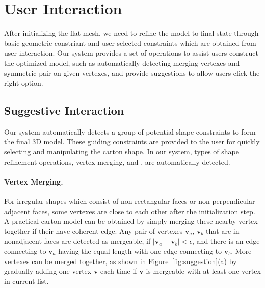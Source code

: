 \section{User Interaction}\label{sec:interaction}
After initializing the flat mesh, we need to refine the model to final state through basic geometric constriant and user-selected constraints which are obtained from user interaction. Our system provides a set of operations to assist users construct the optimized model, such as automatically detecting merging vertexes and symmetric pair on given vertexes, and provide suggestions to allow users click the right option.



\subsection{Suggestive Interaction}

Our system automatically detects a group of potential shape constraints to form the final 3D model.
%
These guiding constraints are provided to the user for quickly selecting and manipulating the carton shape.
In our system,  types of shape refinement operations, vertex merging, and , are automatically detected.

%

\paragraph{Vertex Merging.} 
For irregular shapes which consist of non-rectangular faces or non-perpendicular adjacent faces, some vertexes are close to each other after the initialization step.
A practical carton model can be obtained by simply merging these nearby vertex together if their have coherent edge.
%
Any pair of vertexes $\mathbf{v}_a$, $\mathbf{v}_b$ that are in nonadjacent faces are detected as mergeable, if $|\mathbf{v}_a-\mathbf{v}_b|<\epsilon$, and there is an edge connecting to $\mathbf{v}_a$ having the equal length with one edge connecting to $\mathbf{v}_b$. 
%
More vertexes can be merged together, as shown in Figure~\ref{fig:suggestion}(a) by gradually adding one vertex $\mathbf{v}$ each time if $\mathbf{v}$ is mergeable with at least one vertex in current list. 

